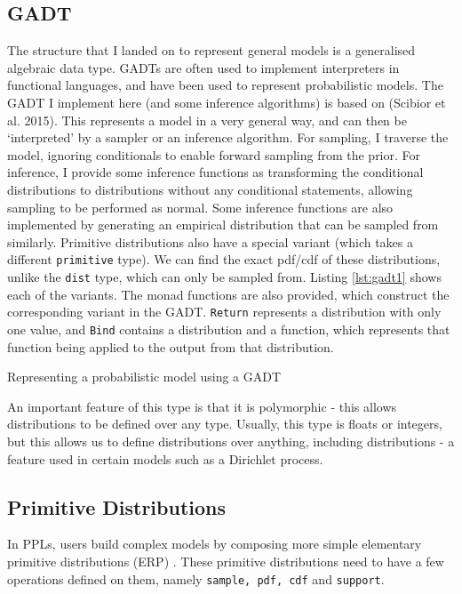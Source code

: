 \subsection{GADT} \label{sec:gadt}
The structure that I landed on to represent general models is a generalised algebraic data type. GADTs are often used to implement interpreters in functional languages, and have been used to represent probabilistic models. The GADT I implement here (and some inference algorithms) is based on (Scibior et al. 2015)\cite{scibior2015practical}. This represents a model in a very general way, and can then be `interpreted' by a sampler or an inference algorithm. For sampling, I traverse the model, ignoring conditionals to enable forward sampling from the prior. For inference, I provide some inference functions as transforming the conditional distributions to distributions without any conditional statements, allowing sampling to be performed as normal. Some inference functions are also implemented by generating an empirical distribution that can be sampled from similarly. Primitive distributions also have a special variant (which takes a different \texttt{primitive} type). We can find the exact pdf/cdf of these distributions, unlike the \texttt{dist} type, which can only be sampled from. Listing \ref{lst:gadt1} shows each of the variants. The monad functions are also provided, which construct the corresponding variant in the GADT. \texttt{Return} represents a distribution with only one value, and \texttt{Bind} contains a distribution and a function, which represents that function being applied to the output from that distribution.

\begin{listing}[!ht]
	\caption{Representing a probabilistic model using a GADT}
	\label{lst:gadt1}
\end{listing}

An important feature of this type is that it is polymorphic - this allows distributions to be defined over any type. Usually, this type is floats or integers, but this allows us to define distributions over anything, including distributions - a feature used in certain models such as a Dirichlet process.

\subsection{Primitive Distributions}
In PPLs, users build complex models by composing more simple elementary primitive distributions (ERP) \cite{pmlr-v15-wingate11a}. These primitive distributions need to have a few operations defined on them, namely \texttt{sample, pdf, cdf} and \texttt{support}.

